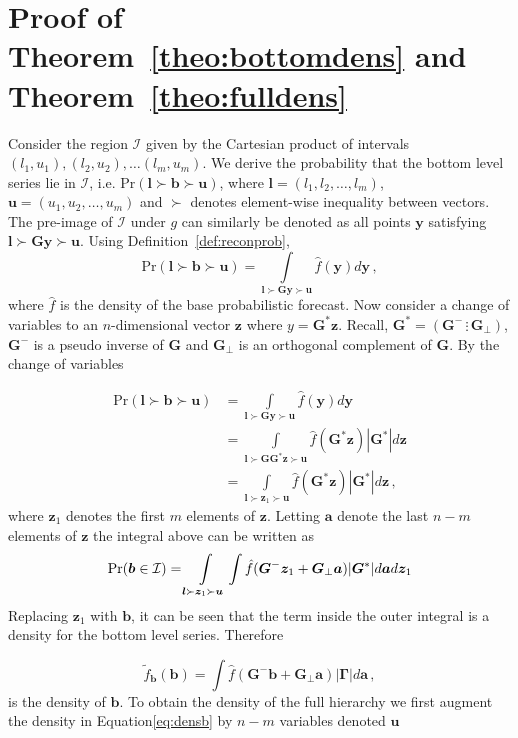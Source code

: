 \documentclass[12pt]{article}
\theoremstyle{definition}
\begin{document}
\newpage

\appendix

\section{Proof of Theorem~\ref{theo:bottomdens} and Theorem~\ref{theo:fulldens}}

Consider the region $\mathcal{I}$ given by the Cartesian product of intervals $(l_1,u_1),(l_2,u_2),\ldots(l_m,u_m)$.  We derive the probability that the bottom level series lie in $\mathcal{I}$, i.e. $\mbox{Pr}(\bm{l}\succ\bm{b}\succ\bm{u})$, where ${\bm l}=(l_1,l_2,\ldots,l_m)$, ${\bm u}=(u_1,u_2,\ldots,u_m)$ and $\succ$ denotes element-wise inequality between vectors.  The pre-image of $\mathcal{I}$ under $g$ can similarly be denoted as all points ${\bm y}$ satisfying $\bm{l}\succ\bm{G}\bm{y}\succ\bm{u}$.  Using Definition~\ref{def:reconprob}, 
\[
\mbox{Pr}(\bm{l}\succ\bm{b}\succ\bm{u})=\int\limits_{\bm{l}\succ\bm{G}\bm{y}\succ\bm{u}}\hat{f}(\bm{y})d{\bm y}\,,
\]
where $\hat{f}$ is the density of the base probabilistic forecast.  Now consider a change of variables to an $n$-dimensional vector ${\bm z}$ where $y={\bm G^*}{\bm z}$. Recall, ${\bm G^*}=\left({\bm G^{-}}\,\vdots\,{\bm G_\perp}\right)$, ${\bm G^{-}}$ is a pseudo inverse of $\bm{G}$ and ${\bm G_\perp}$ is an orthogonal complement of $\bm{G}$.  By the change of variables

\begin{align}
\mbox{Pr}(\bm{l}\succ\bm{b}\succ\bm{u})&=\int\limits_{\bm{l}\succ\bm{G}\bm{y}\succ\bm{u}}\hat{f}(\bm{y})d{\bm y}\nonumber\\
&=\int\limits_{\bm{l}\succ\bm{G}\bm{G}^*\bm{z}\succ\bm{u}}\hat{f}(\bm{G}^*\bm{z})|\bm{G}^*|d{\bm z}\nonumber\\
&=\int\limits_{\bm{l}\succ\bm{z}_1\succ\bm{u}}\hat{f}(\bm{G}^*\bm{z})|\bm{G}^*|d{\bm z}\nonumber\,,
\end{align}
where $\bm{z}_1$ denotes the first $m$ elements of $\bm z$.  Letting $\bm{a}$ denote the last $n-m$ elements of $\bm{z}$ the integral above can be written as
\[ 
\mbox{Pr}({\bm b}\in \mathcal{I})=\int\limits_{\bm{l}\succ\bm{z}_1\succ\bm{u}}\int\hat{f}(\bm{G}^{-}\bm{z}_1+\bm{G}_{\perp}\bm{a})|\bm{G}^*|d{\bm a}d{\bm z}_1\nonumber\\
\]
Replacing ${\bm z}_1$ with ${\bm b}$, it can be seen that the term inside the outer integral is a density for the bottom level series. Therefore

\begin{equation}
\tilde{f}_{\bm{b}}(\bm{b})=\int\hat{f}(\bm{G}^{-}\bm{b}+\bm{G}_{\perp}\bm{a})|\bm{\Gamma}|d{\bm a}\,,
\label{eq:densb}
\end{equation}
is the density of ${\bm b}$. To obtain the density of the full hierarchy we first augment the density in Equation\ref{eq:densb} by $n-m$ variables denoted $\bm{u}$
\end{document}
